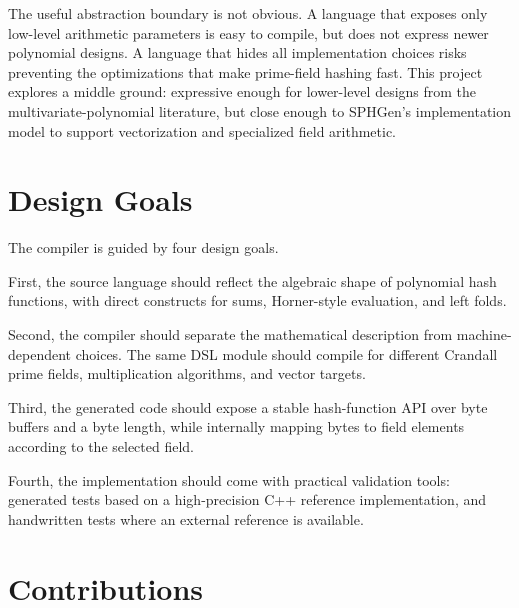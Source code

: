 The useful abstraction boundary is not obvious. A language that exposes only low-level arithmetic parameters is easy to compile, but does not express newer polynomial designs. A language that hides all implementation choices risks preventing the optimizations that make prime-field hashing fast. This project explores a middle ground: expressive enough for lower-level designs from the multivariate-polynomial literature, but close enough to SPHGen's implementation model to support vectorization and specialized field arithmetic.

\section{Design Goals}
\label{sec:design-goals}

The compiler is guided by four design goals.

First, the source language should reflect the algebraic shape of polynomial hash functions, with direct constructs for sums, Horner-style evaluation, and left folds.

Second, the compiler should separate the mathematical description from machine-dependent choices. The same DSL module should compile for different Crandall prime fields, multiplication algorithms, and vector targets.

Third, the generated code should expose a stable hash-function API over byte buffers and a byte length, while internally mapping bytes to field elements according to the selected field.

Fourth, the implementation should come with practical validation tools: generated tests based on a high-precision C++ reference implementation, and handwritten tests where an external reference is available.

\section{Contributions}
\label{sec:contributions}

